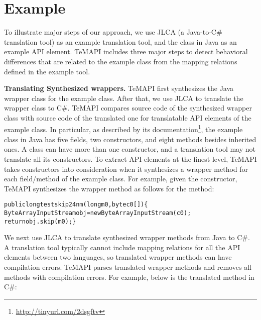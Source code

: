 \section{Example}
\label{sec:example}

To illustrate major steps of our approach, we use JLCA (a Java-to-C\# translation tool) as an example translation tool, and the  class in Java as an example API element. TeMAPI includes three major steps to detect behavioral differences that are related to the example class from the mapping relations defined in the example tool.

\textbf{Translating Synthesized wrappers.} TeMAPI first synthesizes the  Java wrapper class for the example class. After that, we use JLCA to translate the wrapper class to C\#. TeMAPI compares source code of the synthesized wrapper class with source code of the translated one for translatable API elements of the example class. In particular, as described by its documentation\footnote{\url{http://tinyurl.com/2dsgftv}}, the example class in Java has five fields, two constructors, and eight methods besides inherited ones. A class can have more than one constructor, and a translation tool may not translate all its constructors. To extract API elements at the finest level, TeMAPI takes constructors into consideration when it synthesizes a wrapper method for each field/method of the example class. For example, given the  constructor, TeMAPI synthesizes the wrapper method as follows for the  method:

\begin{CodeOut}\vspace*{-1ex}
\begin{alltt}
public long testskip24nm(long m0, byte c0[])\{
  ByteArrayInputStream obj = new ByteArrayInputStream(c0);
  return obj.skip(m0);\}
\end{alltt}
\end{CodeOut}\vspace*{-2ex}

We next use JLCA to translate synthesized wrapper methods from Java to C\#. A translation tool typically cannot include mapping relations for all the API elements between two languages, so translated wrapper methods can have compilation errors. TeMAPI parses translated wrapper methods and removes all methods with compilation errors. For example, below is the translated  method in C\#:
\vspace*{-2ex}

